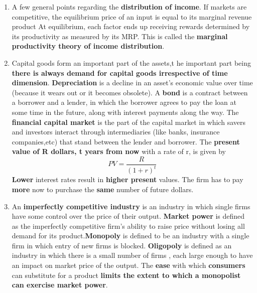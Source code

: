 \documentclass[12pt]{article}
\begin{document}
\begin{enumerate}
\item A few general points regarding the \textbf{distribution of income}. If markets are competitive, the equilibrium price of an input is equal to its marginal revenue product 
At equilibrium, each factor ends up receiving rewards determined by its productivity as measured by its MRP. This is called the \textbf{marginal productivity theory of income distribution}.
\item Capital goods form an important part of the assets,t he important part being \textbf{there is always demand for capital goods irrespective of time dimension}. \textbf{Depreciation} is a decline in an asset's economic value over time (because it wears out or it becomes obsolete). 
A \textbf{bond} is a contract between a borrower and a lender, in which the borrower agrees to pay the loan at some time in the future, along with interest payments along the way.
The \textbf{financial capital market} is the part of the capital market in which savers and investors interact through intermediaries (like banks, insurance companies,etc) that stand between the lender and borrower.
The \textbf{present value of R dollars, t years from now} with a rate of r, is given by 
$$PV = \frac{R}{(1+r)^t}$$
\textbf{Lower} interest rates result in \textbf{higher present} values.  The firm has to pay \textbf{more} now to purchase the \textbf{same} number of future dollars.

\item An \textbf{imperfectly competitive industry} is an industry in which single firms have some control over the price of their output. \textbf{Market power} is defined as the imperfectly competitive firm's ability to raise price without losing all demand for its product.\textbf{Monopoly} is defined to be an industry with a single firm in which entry of new firms is blocked. \textbf{Oligopoly} is defined as an industry in which there is a small number of firms , each large enough to have an impact on market price of the output.
The \textbf{ease} with which \textbf{consumers} can substitute for a product \textbf{limits the extent to which a monopolist can exercise market power}.


\end{enumerate}
\end{document}

